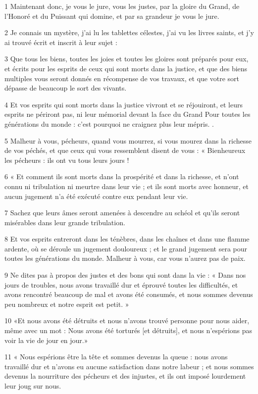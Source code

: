 \par 1 Maintenant donc, je vous le jure, vous les justes, par la gloire du Grand, de l'Honoré et du Puissant qui domine, et par sa grandeur je vous le jure.
\par 2 Je connais un mystère, j'ai lu les tablettes célestes, j'ai vu les livres saints, et j'y ai trouvé écrit et inscrit à leur sujet :
\par 3 Que tous les biens, toutes les joies et toutes les gloires sont préparés pour eux, et écrits pour les esprits de ceux qui sont morts dans la justice, et que des biens multiples vous seront donnés en récompense de vos travaux, et que votre sort dépasse de beaucoup le sort des vivants.
\par 4 Et vos esprits qui sont morts dans la justice vivront et se réjouiront, et leurs esprits ne périront pas, ni leur mémorial devant la face du Grand Pour toutes les générations du monde : c'est pourquoi ne craignez plus leur mépris. .
\par 5 Malheur à vous, pécheurs, quand vous mourrez, si vous mourez dans la richesse de vos péchés, et que ceux qui vous ressemblent disent de vous : « Bienheureux les pécheurs : ils ont vu tous leurs jours !
\par 6 « Et comment ils sont morts dans la prospérité et dans la richesse, et n'ont connu ni tribulation ni meurtre dans leur vie ; et ils sont morts avec honneur, et aucun jugement n'a été exécuté contre eux pendant leur vie.
\par 7 Sachez que leurs âmes seront amenées à descendre au schéol et qu'ils seront misérables dans leur grande tribulation.
\par 8 Et vos esprits entreront dans les ténèbres, dans les chaînes et dans une flamme ardente, où se déroule un jugement douloureux ; et le grand jugement sera pour toutes les générations du monde. Malheur à vous, car vous n'aurez pas de paix.
\par 9 Ne dites pas à propos des justes et des bons qui sont dans la vie : « Dans nos jours de troubles, nous avons travaillé dur et éprouvé toutes les difficultés, et avons rencontré beaucoup de mal et avons été consumés, et nous sommes devenus peu nombreux et notre esprit est petit. »
\par 10 «Et nous avons été détruits et nous n'avons trouvé personne pour nous aider, même avec un mot : Nous avons été torturés [et détruits], et nous n'espérions pas voir la vie de jour en jour.»
\par 11 « Nous espérions être la tête et sommes devenus la queue : nous avons travaillé dur et n'avons eu aucune satisfaction dans notre labeur ; et nous sommes devenus la nourriture des pécheurs et des injustes, et ils ont imposé lourdement leur joug sur nous.
